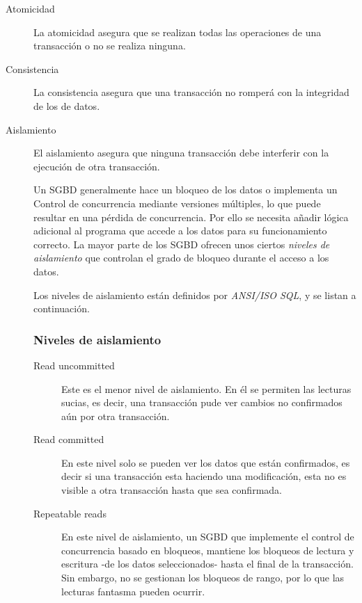 	\begin{description}
	\item[Atomicidad]
		La atomicidad asegura que se realizan todas las operaciones de una transacción
		o no se realiza ninguna.
		
	\item[Consistencia]
		 La consistencia asegura que una transacción no romperá con la integridad de
		 los de datos.
	  
	\item[Aislamiento]	
		El aislamiento asegura que ninguna transacción debe interferir con la
		ejecución de otra transacción.
		
		Un SGBD generalmente hace un bloqueo de los datos o implementa un Control de
		concurrencia mediante versiones múltiples, lo que puede resultar en una
		pérdida de concurrencia. Por ello se necesita añadir lógica adicional al
		programa que accede a los datos para su funcionamiento correcto.
		La mayor parte de los SGBD ofrecen unos ciertos \emph{niveles de aislamiento}
		que controlan el grado de bloqueo durante el acceso a los datos.
		
		Los niveles de aislamiento están definidos por \emph{ANSI/ISO SQL}, y se listan
		a continuación.
		
		\subsubsection{Niveles de aislamiento}
		\label{isolation}
	
		\begin{description}

			\item [Read uncommitted]
				Este es el menor nivel de aislamiento. En él se permiten las lecturas
				sucias, es decir, una transacción pude ver cambios no confirmados
				aún por otra transacción.
			
			\item [Read committed]
				En este nivel solo se pueden ver los datos que están confirmados, es decir si
				una  transacción esta haciendo una modificación, esta no es visible a otra
				transacción hasta que sea confirmada.
				
			\item [Repeatable reads] 
				En este nivel de aislamiento, un SGBD que implemente el control de
				concurrencia basado en bloqueos, mantiene los bloqueos de lectura y escritura
				-de los datos seleccionados- hasta el final de la transacción. Sin embargo, no
				se gestionan los bloqueos de rango, por lo que las lecturas fantasma pueden
				ocurrir.
			

\end{description}
\end{description}

